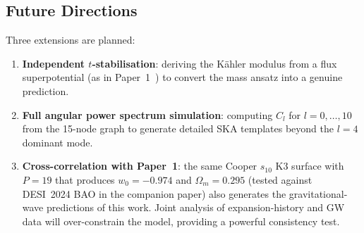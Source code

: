 \subsection{Future Directions}

Three extensions are planned:
\begin{enumerate}
    \item \textbf{Independent $t$-stabilisation}: deriving the K\"ahler modulus from a flux superpotential (as in Paper~1~\cite{LeanProposal}) to convert the mass ansatz into a genuine prediction.
    \item \textbf{Full angular power spectrum simulation}: computing $C_l$ for $l = 0, \ldots, 10$ from the 15-node graph to generate detailed SKA templates beyond the $l = 4$ dominant mode.
    \item \textbf{Cross-correlation with Paper~1}: the same Cooper $s_{10}$ K3 surface with $P = 19$ that produces $w_0 = -0.974$ and $\Omega_m = 0.295$ (tested against DESI~2024 BAO in the companion paper) also generates the gravitational-wave predictions of this work.  Joint analysis of expansion-history and GW data will over-constrain the model, providing a powerful consistency test.
\end{enumerate}
